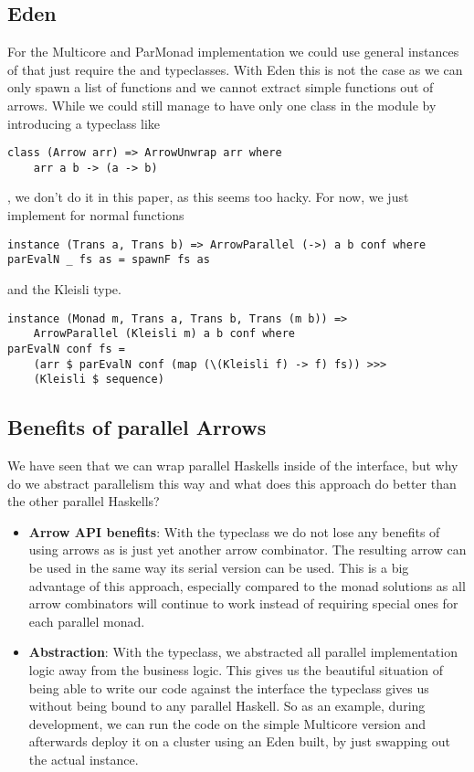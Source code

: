 \subsection{Eden}
For the Multicore and ParMonad implementation we could use general instances of  that just require the  and  typeclasses. With Eden this is not the case as we can only spawn a list of functions and we cannot extract simple functions out of arrows. While we could still manage to have only one class in the module by introducing a typeclass like
\begin{lstlisting}[frame=htrbl]
class (Arrow arr) => ArrowUnwrap arr where
	arr a b -> (a -> b)
\end{lstlisting}
, we don't do it in this paper, as this seems too hacky. For now, we just implement  for normal functions
\begin{lstlisting}[frame=htrbl]
instance (Trans a, Trans b) => ArrowParallel (->) a b conf where
parEvalN _ fs as = spawnF fs as
\end{lstlisting}
and the Kleisli type.
\begin{lstlisting}[frame=htrbl]
instance (Monad m, Trans a, Trans b, Trans (m b)) =>
	ArrowParallel (Kleisli m) a b conf where
parEvalN conf fs =
	(arr $ parEvalN conf (map (\(Kleisli f) -> f) fs)) >>>
	(Kleisli $ sequence)
\end{lstlisting}

\subsection{Benefits of parallel Arrows}
We have seen that we can wrap parallel Haskells inside of the  interface, but why do we abstract parallelism this way and what does this approach do better than the other parallel Haskells?
\begin{itemize}
	\item \textbf{Arrow API benefits}:
	With the  typeclass we do not lose any benefits of using arrows as  is just yet another arrow combinator. The resulting arrow can be used in the same way its serial version can be used. This is a big advantage of this approach, especially compared to the monad solutions as all arrow combinators will continue to work instead of requiring special ones for each parallel monad.
	\item \textbf{Abstraction}:
	With the  typeclass, we abstracted all parallel implementation logic away from the business logic. This gives us the beautiful situation of being able to write our code against the interface the typeclass gives us without being bound to any parallel Haskell. So as an example, during development, we can run the code on the simple Multicore version and afterwards deploy it on a cluster using an Eden built, by just swapping out the actual  instance.
\end{itemize}
